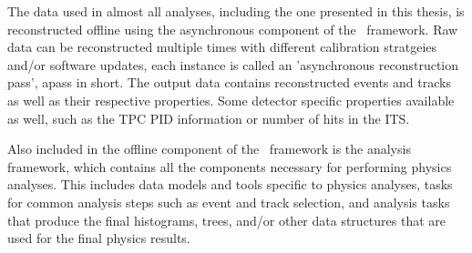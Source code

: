   The data used in almost all analyses, including the one presented in this thesis, is reconstructed offline using the asynchronous component of the \otwo\ framework. Raw data can be reconstructed multiple times with different calibration stratgeies and/or software updates, each instance is called an 'asynchronous reconstruction pass', apass in short. The output data contains reconstructed events and tracks as well as their respective properties. Some detector specific properties available as well, such as the TPC PID information or number of hits in the ITS. 
  
  Also included in the offline component of the \otwo\ framework is the analysis framework, which contains all the components necessary for performing physics analyses. This includes data models and tools specific to physics analyses, tasks for common analysis steps such as event and track selection, and analysis tasks that produce the final histograms, trees, and/or other data structures that are used for the final physics results. 